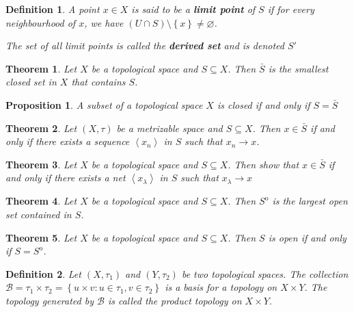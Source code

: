 \documentclass[12pt,twoside]{report}
\newtheorem{defn}{Definition}
\newtheorem{thm}{Theorem}
\newtheorem{prop}[subsection]{Proposition}
\begin{document}
\begin{defn}
    A point $x \in X$ is said to be a \textbf{limit point} of $S$ if for every neighbourhood of $x$, we have $\left (U \cap S\right ) \setminus \left\{ x \right\} \neq  \varnothing $.

    The set of all limit points is called the \textbf{derived set} and is denoted $S'$
\end{defn}

\begin{thm}
    Let $X$ be a topological space and $S \subseteq X$. Then $\bar{S}$ is the smallest closed set in $X$ that contains $S$.
\end{thm}

\begin{prop}
    A subset of a topological space $X$ is closed if and only if $S = \bar{S}$
\end{prop}

\begin{thm}
    Let $\left (X, \tau\right )$ be a metrizable space and $S \subseteq X$. Then $x \in \bar{S}$ if and only if there exists a sequence $\left\langle x_n\right\rangle $ in $S$ such that $x_n \to x$.
\end{thm}

\begin{thm}
    Let $X$ be a topological space and $S \subseteq X$. Then show that $x \in \bar{S}$ if and only if there exists a net $\left\langle  x_\lambda \right\rangle $ in $S$ such that $ x_\lambda \to x$
\end{thm}

\begin{thm}
    Let $X$ be a topological space and $S \subseteq X$. Then $S ^\mathrm{o}$ is the largest open set contained in $S$.
\end{thm}

\begin{thm}
    Let $X$ be a topological space and $S \subseteq X$. Then $S$ is open if and only if $S = S ^\mathrm{o}$.
\end{thm}

\begin{defn}
    Let $\left (X, \tau_1\right )$ and $\left (Y, \tau_2\right )$ be two topological spaces. The collection $\mathcal{B} = \tau_1 \times \tau_2 = \left\{ u \times v  :  u \in \tau_1, v \in \tau_2 \right\}$ is a basis for a topology on $X \times Y$.
    The topology generated by $\mathcal{B}$ is called the product topology on $X \times Y$.
\end{defn}
\end{document}
